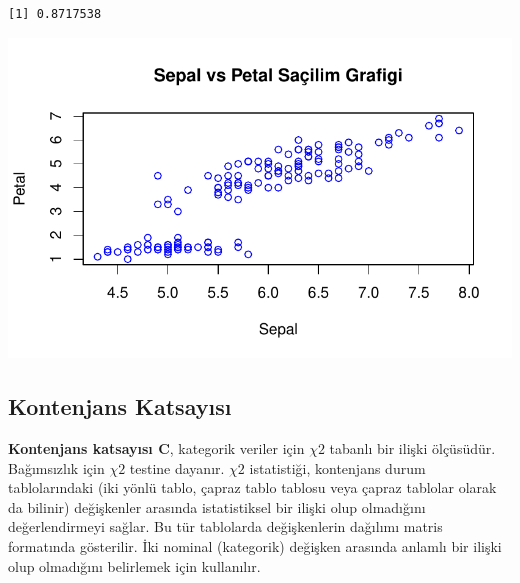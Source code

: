 \documentclass[
  letterpaper,
  DIV=11,
  numbers=noendperiod]{scrreprt}
\newenvironment{Shaded}{\begin{snugshade}}{\end{snugshade}}
\newcommand{\AttributeTok}[1]{\textcolor[rgb]{0.40,0.45,0.13}{#1}}
\newcommand{\CommentTok}[1]{\textcolor[rgb]{0.37,0.37,0.37}{#1}}
\newcommand{\FunctionTok}[1]{\textcolor[rgb]{0.28,0.35,0.67}{#1}}
\newcommand{\NormalTok}[1]{\textcolor[rgb]{0.00,0.23,0.31}{#1}}
\newcommand{\SpecialCharTok}[1]{\textcolor[rgb]{0.37,0.37,0.37}{#1}}
\newcommand{\StringTok}[1]{\textcolor[rgb]{0.13,0.47,0.30}{#1}}
\begin{document}
\begin{Shaded}
\end{Shaded}

\begin{verbatim}
[1] 0.8717538
\end{verbatim}

\begin{Shaded}
\end{Shaded}

\includegraphics{statistics_files/figure-pdf/unnamed-chunk-12-1.pdf}

\subsection*{Kontenjans Katsayısı}\label{kontenjans-katsayux131sux131}

\textbf{Kontenjans katsayısı C}, kategorik veriler için \(\chi 2\)
tabanlı bir ilişki ölçüsüdür. Bağımsızlık için \(\chi 2\) testine
dayanır. \(\chi 2\) istatistiği, kontenjans durum tablolarındaki (iki
yönlü tablo, çapraz tablo tablosu veya çapraz tablolar olarak da
bilinir) değişkenler arasında istatistiksel bir ilişki olup olmadığını
değerlendirmeyi sağlar. Bu tür tablolarda değişkenlerin dağılımı matris
formatında gösterilir. İki nominal (kategorik) değişken arasında anlamlı
bir ilişki olup olmadığını belirlemek için kullanılır.
\end{document}
